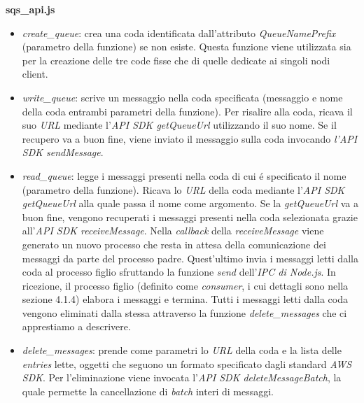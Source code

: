 \documentclass{article}
\begin{document}
\textbf{sqs\_api.js}
\begin{itemize}
\item{\textit{create\_queue}: crea una coda identificata dall'attributo \textit{QueueNamePrefix} (parametro della funzione) se non esiste. Questa funzione viene utilizzata sia per la creazione delle tre code fisse che di quelle dedicate ai singoli nodi client.}
\item{\textit{write\_queue}: scrive un messaggio nella coda specificata (messaggio e nome della coda entrambi parametri della funzione). Per risalire alla coda, ricava il suo \textit{URL} mediante l'\textit{API SDK getQueueUrl} utilizzando il suo nome. Se il recupero va a buon fine, viene inviato il messaggio sulla coda invocando \textit{l'API SDK sendMessage}.}
\item{\textit{read\_queue}: legge i messaggi presenti nella coda di cui \'e specificato il nome (parametro della funzione). Ricava lo \textit{URL} della coda mediante l'\textit{API SDK getQueueUrl} alla quale passa il nome come argomento. Se la \textit{getQueueUrl} va a buon fine, vengono recuperati i messaggi presenti nella coda selezionata grazie all'\textit{API SDK receiveMessage}. Nella \textit{callback} della \textit{receiveMessage} viene generato un nuovo processo che resta in attesa della comunicazione dei messaggi da parte del processo padre. Quest'ultimo invia i messaggi letti dalla coda al processo figlio sfruttando la funzione \textit{send} dell'\textit{IPC di Node.js}.  In ricezione, il processo figlio (definito come \textit{consumer}, i cui dettagli sono nella sezione 4.1.4) elabora i messaggi e termina. Tutti i messaggi letti dalla coda vengono eliminati dalla stessa attraverso la funzione \textit{delete\_messages} che ci apprestiamo a descrivere.}
\item{\textit{delete\_messages}: prende come parametri lo \textit{URL} della coda e la lista delle \textit{entries} lette, oggetti che seguono un formato specificato dagli standard \textit{AWS SDK}. Per l'eliminazione viene invocata l'\textit{API SDK deleteMessageBatch}, la quale permette la cancellazione di \textit{batch} interi di messaggi.}
\end{itemize}
\end{document}
